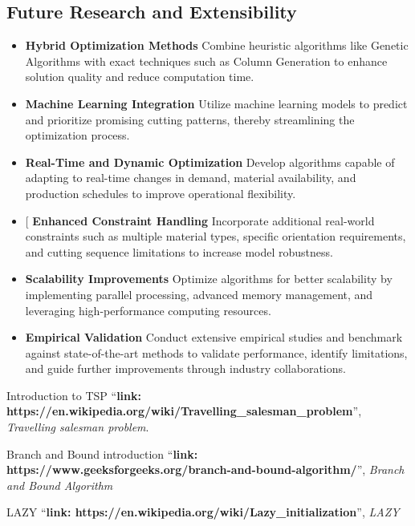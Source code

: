 \documentclass[a4paper]{article}
\begin{document}
\subsection{Future Research and Extensibility}

\begin{itemize}

    \item \textbf{Hybrid Optimization Methods} Combine heuristic algorithms like Genetic Algorithms with exact techniques such as Column Generation to enhance solution quality and reduce computation time.
    
    \item \textbf{Machine Learning Integration} Utilize machine learning models to predict and prioritize promising cutting patterns, thereby streamlining the optimization process.
    
    \item \textbf{Real-Time and Dynamic Optimization} Develop algorithms capable of adapting to real-time changes in demand, material availability, and production schedules to improve operational flexibility.
    
    \item[ \textbf{Enhanced Constraint Handling} Incorporate additional real-world constraints such as multiple material types, specific orientation requirements, and cutting sequence limitations to increase model robustness.
    
    \item \textbf{Scalability Improvements} Optimize algorithms for better scalability by implementing parallel processing, advanced memory management, and leveraging high-performance computing resources.

    
    \item \textbf{Empirical Validation} Conduct extensive empirical studies and benchmark against state-of-the-art methods to validate performance, identify limitations, and guide further improvements through industry collaborations.

\end{itemize}
\begin{thebibliography}{80}

Introduction to TSP
``\textbf{link: https://en.wikipedia.org/wiki/Travelling\_salesman\_problem}'',
\textit{Travelling salesman problem}.

Branch and Bound introduction
``\textbf{link: https://www.geeksforgeeks.org/branch-and-bound-algorithm/}'', \textit{Branch and Bound Algorithm}

LAZY
``\textbf{link: https://en.wikipedia.org/wiki/Lazy_initialization}'', \textit{LAZY}


\end{thebibliography}
\end{document}
